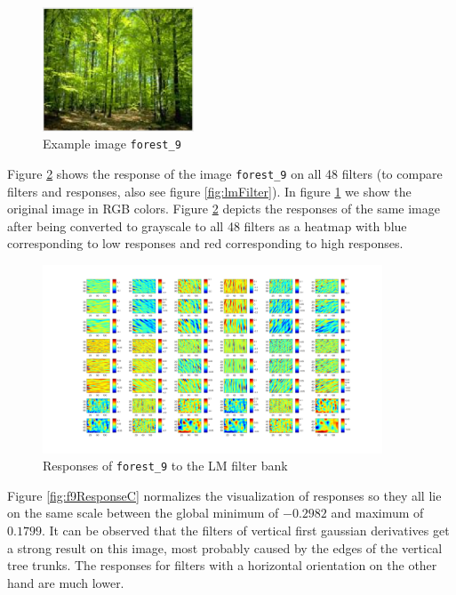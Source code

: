 \begin{figure}[!hbt]
  \centering
  \includegraphics[width=0.4\textwidth]{img/f9}
  \caption{Example image \texttt{forest\_9}}
  \label{fig:f9ResponseA}
\end{figure}

Figure \ref{fig:f9ResponseB} shows the response of the image \texttt{forest\_9} on all 48 filters (to compare filters and responses, also see figure \ref{fig:lmFilter}). In figure \ref{fig:f9ResponseA} we show the original image in RGB colors. Figure \ref{fig:f9ResponseB} depicts the responses of the same image after being converted to grayscale to all 48 filters as a heatmap with blue corresponding to low responses and red corresponding to high responses.

\begin{figure}[!hbt]
  \centering
  \includegraphics[width=0.9\textwidth]{img/f9_responses}
  \caption{Responses of \texttt{forest\_9} to the LM filter bank}
  \label{fig:f9ResponseB}
\end{figure}

Figure \ref{fig:f9ResponseC} normalizes the visualization of responses so they all lie on the same scale between the global minimum of $-0.2982$ and maximum of $0.1799$. It can be observed that the filters of vertical first gaussian derivatives get a strong result on this image, most probably caused by the edges of the vertical tree trunks. The responses for filters with a horizontal orientation on the other hand are much lower.

